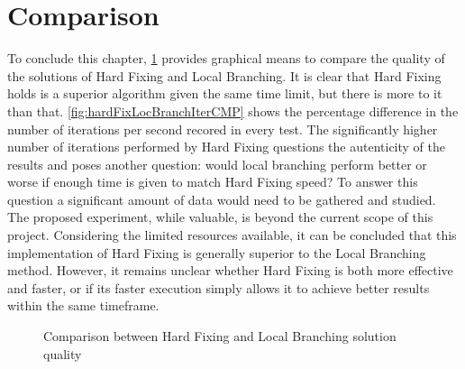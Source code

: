 \section{Comparison}
To conclude this chapter, \figurename{ \ref{fig:hardFixLocBranchCMP}} provides graphical means to compare the quality of the solutions of Hard Fixing and Local Branching.
It is clear that Hard Fixing holds is a superior algorithm given the same time limit, but there is more to it than that.
\figurename{ \ref{fig:hardFixLocBranchIterCMP}} shows the percentage difference in the number of iterations per second recored in every test.
The significantly higher number of iterations performed by Hard Fixing questions the autenticity of the results and poses another question: would local branching perform better or worse if enough time is given to match Hard Fixing speed?
To answer this question a significant amount of data would need to be gathered and studied.
The proposed experiment, while valuable, is beyond the current scope of this project.
Considering the limited resources available, it can be concluded that this implementation of Hard Fixing is generally superior to the Local Branching method.
However, it remains unclear whether Hard Fixing is both more effective and faster, or if its faster execution simply allows it to achieve better results within the same timeframe.

\begin{figure}[htbp]
	\centering
	\caption{Comparison between Hard Fixing and Local Branching solution quality \label{fig:hardFixLocBranchCMP}}
\end{figure}

